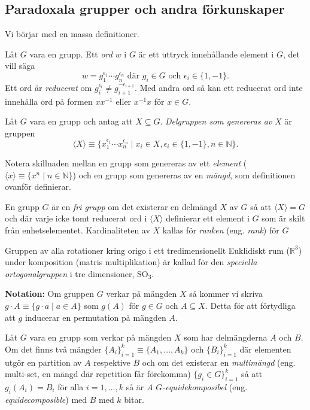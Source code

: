 \documentclass{article}
\theoremstyle{definition}
\begin{document}
\subsection{Paradoxala grupper och andra förkunskaper}
Vi börjar med en massa definitioner.

\begin{mydef}{}{}
  Låt $G$ vara en grupp. Ett \textit{ord} $w$ i $G$ är ett uttryck innehållande element i $G$, det vill säga 
  \[w = g_1^{\epsilon_1} \cdots g_n^{\epsilon_n} \text{ där } g_i \in G \text{ och } \epsilon_i \in \{1, -1\}.\]  
  Ett ord är \textit{reducerat} om $g_i^{\epsilon_i} \neq g_{i+1}^{-\epsilon_{i+1}}$. Med andra ord så kan ett reducerat ord inte innehålla 
  ord på formen $xx^{-1}$ eller $x^{-1}x$ för $x \in G$. 
\end{mydef}

\begin{mydef}{}{}
  Låt $G$ vara en grupp och antag att $X \subseteq G$. \textit{Delgruppen som genereras av} $X$ är gruppen
  \[\langle X \rangle \equiv \{x_1^{\epsilon_1} \cdots x_n^{\epsilon_n} \; | \; x_i \in X, \epsilon_i \in \{1, -1\}, n \in \mathbb{N}  \}.\]
\end{mydef}
Notera skillnaden mellan en grupp som genereras av ett \textit{element} ($\langle x\rangle \equiv \{x^n \; | \; n \in \mathbb{N}\}$)
och en grupp som genereras av en \textit{mängd}, som definitionen ovanför definierar.

\begin{mydef}{}{}
  En grupp $G$ är en \textit{fri grupp} om det existerar en delmängd $X$ av $G$ så att $\langle X \rangle = G$ och 
  där varje icke tomt reducerat ord i $\langle X \rangle$ definierar ett element i $G$ som är skilt från enhetselementet. Kardinaliteten av $X$
  kallas för \textit{ranken} (eng. \textit{rank}) för $G$
\end{mydef}

\begin{mydef}{}{}
  Gruppen av alla rotationer kring origo i ett tredimensionellt Euklidiskt rum ($\mathbb{R}^3$) under komposition (matris multiplikation) är 
  kallad för den \textit{speciella ortogonalgruppen} i tre dimensioner, $\text{SO}_3$.
\end{mydef}

\textbf{Notation:} Om gruppen $G$ verkar på mängden $X$ så kommer vi skriva $g \cdot A \equiv \{g \cdot a \; | \; a \in A\}$
som $g(A)$ för $g \in G$ och $A \subseteq X$. Detta för att förtydliga att $g$ inducerar en permutation på mängden $A$.
\begin{mydef}{}{}
  Låt $G$ vara en grupp som verkar på mängden $X$ som har delmängderna $A$ och $B$. 
  Om det finns två mängder $\{A_i\}_{i = 1}^k \equiv \{A_1, \ldots, A_k\}$ och $\{B_i\}_{i = 1}^k$ där elementen 
  utgör en partition av $A$ respektive $B$ och om det existerar en \textit{multimängd} (eng. multi-set, en mängd där repetition får förekomma) 
  $\{g_i \in G\}_{i = 1}^k$ så att $g_i(A_i) = B_i$ för alla $i = 1, \ldots, k$ 
  så är $A$ $G$\textit{-equidekomposibel} (eng. \textit{equidecomposible}) med $B$ med $k$ bitar. 
\end{mydef}
\end{document}
